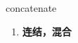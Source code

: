 
\begin{frame}
{\huge concatenate}
\begin{center}
\begin{enumerate}\Large
  \item \textbf{连结，混合}
\end{enumerate}
\end{center}
\end{frame}

